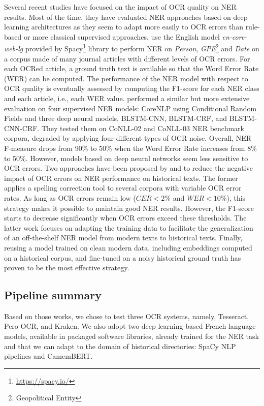 Several recent studies have focused on the impact of OCR quality on NER results. Most of the time, they have evaluated NER approaches based on deep learning architectures as they seem to adapt more easily to OCR errors than rule-based or more classical supervised approaches.
\cite{van2020assessing} use the English model \textit{en-core-web-lg} provided by Spacy\footnote{\url{https://spacy.io/}} library to perform NER on \textit{Person}, \textit{GPE}\footnote{Geopolitical Entity} and \textit{Date} on a corpus made of many journal articles with different levels of OCR errors.
For each OCRed article, a ground truth text is available so that the Word Error Rate (WER) can be computed.
The performance of the NER model with respect to OCR quality is eventually assessed by computing the F1-score for each NER class and each article, i.e., each WER value.
\cite{hamdi2020assessing} performed a similar but more extensive evaluation on four supervised NER models: CoreNLP using Conditional Random Fields and three deep neural models, BLSTM-CNN, BLSTM-CRF, and BLSTM-CNN-CRF.
They tested them on CoNLL-02 and CoNLL-03 NER benchmark corpora, degraded by applying four different types of OCR noise. Overall, NER F-measure drops from 90\% to 50\% when the Word Error Rate increases from 8\% to 50\%. However, models based on deep neural networks seem less sensitive to OCR errors. 
Two approaches have been proposed by \cite{huynh2020use} and \cite{marz2021data}  to reduce the negative impact of OCR errors on NER performance on historical texts.
The former applies a spelling correction tool to several corpora with variable OCR error rates. 
As long as OCR errors remain low ($CER<2\%$ and $WER<10\%$), this strategy makes it possible to maintain good NER results. However, the F1-score starts to decrease significantly when OCR errors exceed these thresholds.
The latter work focuses on adapting the training data to facilitate the generalization of an off-the-shelf NER model from modern texts to historical texts.
Finally, reusing a model trained on clean modern data, including embeddings computed on a historical corpus, and fine-tuned on a noisy historical ground truth has proven to be the most effective strategy.

\subsection{Pipeline summary}

Based on those works, we chose to test three OCR systems, namely, Tesseract, Pero OCR, and Kraken. We also adopt two deep-learning-based French language models, available in packaged software libraries, already trained for the NER task and that we can adapt to the domain of historical directories: SpaCy NLP pipelines and CamemBERT.

